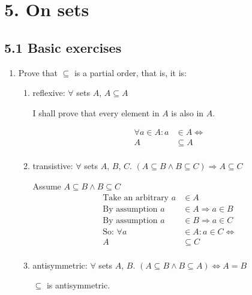 \documentclass[10pt,\jkfside,a4paper]{article}
\begin{document}
\section*{5. On sets}

\subsection*{5.1 Basic exercises}

\begin{enumerate}

\item Prove that $\subseteq$ is a partial order, that is, it is:

\begin{enumerate}

\item reflexive: $\forall$ sets $A$, $A \subseteq A$

I shall prove that every element in $A$ is also in $A$.

\begin{equation}
\begin{split}
\forall a \in A: a &\in A \Longleftrightarrow\\
A &\subseteq A\\
\end{split}
\end{equation}

\item transistive: $\forall$ sets $A$, $B$, $C$. $(A \subseteq B \wedge B \subseteq C) \Longrightarrow A \subseteq C$

Assume $A \subseteq B \wedge B \subseteq C$
\begin{equation}
\begin{split}
\text{Take an arbitrary } a &\in A \\
\text{By assumption } a & \in A \Longrightarrow a \in B\\
\text{By assumption } a &\in B \Longrightarrow a \in C\\
\text{So: } \forall a &\in A: a \in C \Longleftrightarrow\\
A &\subseteq C\\
\end{split}
\end{equation}

\item antisymmetric: $\forall$ sets $A$, $B$. $(A \subseteq B \wedge B \subseteq A) \Longleftrightarrow A = B$

$\subseteq$ is antisymmetric. 


\end{enumerate}
\end{enumerate}
\end{document}
